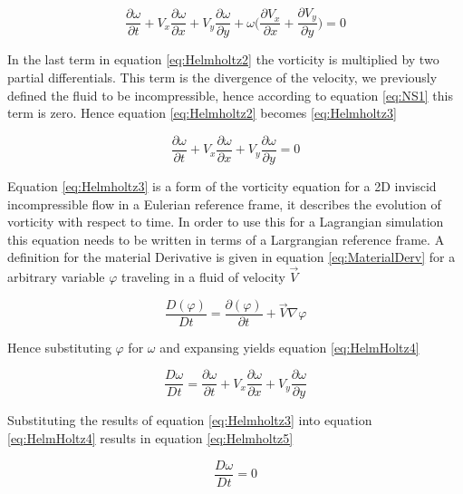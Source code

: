 \begin{equation}
\label{eq:Helmholtz2}
\frac{\partial \omega}{\partial t}+V_x\frac{\partial \omega}{\partial x}+V_y\frac{\partial \omega}{\partial y}+\omega \Big(\frac{\partial V_x}{\partial x}+\frac{\partial V_y}{\partial y}\Big)=0
\end{equation}

In the last term in equation \ref{eq:Helmholtz2} the vorticity is multiplied by two partial differentials. This term is the divergence of the velocity, we previously defined the fluid to be incompressible, hence according to equation \ref{eq:NS1} this term is zero. Hence equation \ref{eq:Helmholtz2} becomes \ref{eq:Helmholtz3}

\begin{equation}
\label{eq:Helmholtz3}
\frac{\partial \omega}{\partial t}+V_x\frac{\partial \omega}{\partial x}+V_y\frac{\partial \omega}{\partial y}=0
\end{equation}

Equation \ref{eq:Helmholtz3} is a form of the vorticity equation for a 2D inviscid incompressible flow in a Eulerian reference frame, it describes the evolution of vorticity with respect to time. In order to use this for a Lagrangian simulation this equation needs to be written in terms of a Largrangian reference frame. A definition for the material Derivative is given in equation \ref{eq:MaterialDerv} for a arbitrary variable $\varphi$ traveling in a fluid of velocity $\vec{V}$

\begin{equation}
\label{eq:MaterialDerv}
\frac{D(\varphi)}{Dt}=\frac{\partial (\varphi)}{\partial t}+\vec{V}\nabla \varphi
\end{equation}

Hence substituting $\varphi$ for $\omega$ and expansing yields equation \ref{eq:HelmHoltz4}

\begin{equation}
\label{eq:HelmHoltz4}
\frac{D\omega}{Dt}=\frac{\partial \omega}{\partial t}+V_x\frac{\partial \omega}{\partial x}+V_y\frac{\partial \omega}{\partial y}
\end{equation}

Substituting the results of equation \ref{eq:Helmholtz3} into equation \ref{eq:HelmHoltz4} results in equation \ref{eq:Helmholtz5}

\begin{equation}
\label{eq:Helmholtz5}
\frac{D\omega}{Dt}=0
\end{equation}

